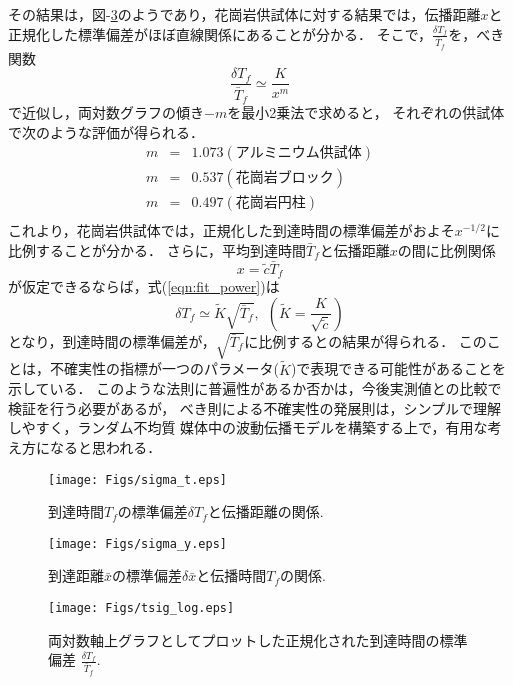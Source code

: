 その結果は，図-\ref{fig:fig17}のようであり，花崗岩供試体に対する結果では，伝播距離$x$と
正規化した標準偏差がほぼ直線関係にあることが分かる．
そこで，$\frac{\delta T_f}{\bar{T}_f}$を，べき関数
\begin{equation}
	\frac{\delta T_f }{\bar{T}_f} \simeq \frac{K}{x^m}
	\label{eqn:fit_power}
\end{equation}
で近似し，両対数グラフの傾き$-m$を最小2乗法で求めると，
それぞれの供試体で次のような評価が得られる．
\begin{eqnarray}
	m &=& 1.073 (アルミニウム供試体) \\
	m &=& 0.537 (花崗岩ブロック)\\
	m &=& 0.497 (花崗岩円柱)\\
\end{eqnarray}
これより，花崗岩供試体では，正規化した到達時間の標準偏差がおよそ$x^{-1/2}$に比例することが分かる．
さらに，平均到達時間$\bar T_f$と伝播距離$x$の間に比例関係
\begin{equation}
	x=\tilde c \bar T_f
	\label{linfit_x}
\end{equation}
が仮定できるならば，式(\ref{eqn:fit_power})は
\begin{equation}
	\delta T_f \simeq \tilde K \sqrt{ \bar{T}_f}, \  \ 
	\left( \tilde K=\frac{K}{\sqrt{\tilde c}}\right)
	\label{eqn:plaw} 
\end{equation}
となり，到達時間の標準偏差が，$\sqrt{\bar{T}_f}$に比例するとの結果が得られる．
このことは，不確実性の指標が一つのパラメータ($\tilde K$)で表現できる可能性があることを
示している．
このような法則に普遍性があるか否かは，今後実測値との比較で検証を行う必要があるが，
べき則による不確実性の発展則は，シンプルで理解しやすく，ランダム不均質
媒体中の波動伝播モデルを構築する上で，有用な考え方になると思われる．
\begin{figure}
\begin{center}
	\texttt{[image: Figs/sigma\_t.eps]}
	\caption{到達時間$T_f$の標準偏差$\delta T_f$と伝播距離の関係. }
	\label{fig:fig15}
\end{center}
\end{figure}
\begin{figure}
\begin{center}
	\texttt{[image: Figs/sigma\_y.eps]}
	\caption{到達距離$\bar{x}$の標準偏差$\delta \bar{x}$と伝播時間$T_f$の関係. }
	\label{fig:fig16}
\end{center}
\end{figure}
\begin{figure}
\begin{center}
	\texttt{[image: Figs/tsig\_log.eps]}
	\caption{
		両対数軸上グラフとしてプロットした正規化された到達時間の標準偏差
			$\frac{\delta T_f}{\bar{T}_f}$. 
		}
	\label{fig:fig17}
\end{center}
\end{figure}
